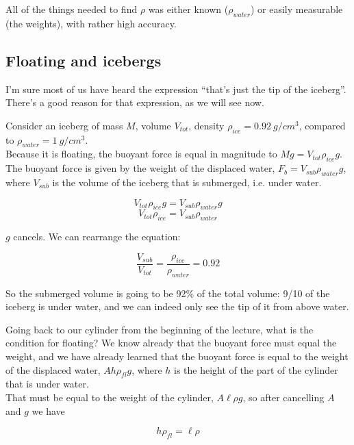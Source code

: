 All of the things needed to find $\rho$ was either known ($\rho_{water}$) or easily measurable (the weights), with rather high accuracy.

\subsection{Floating and icebergs}

I'm sure most of us have heard the expression ``that's just the tip of the iceberg''. There's a good reason for that expression, as we will see now.

Consider an iceberg of mass $M$, volume $V_{tot}$, density $\rho_{ice} = \SI{0.92}{g/cm^3}$, compared to $\rho_{water} = \SI{1}{g/cm^3}$.\\
Because it is floating, the buoyant force is equal in magnitude to $M g = V_{tot} \rho_{ice} g$. The buoyant force is given by the weight of the displaced water, $F_b = V_{sub} \rho_{water} g$, where $V_{sub}$ is the volume of the iceberg that is submerged, i.e. under water.

\begin{equation}
V_{tot} \rho_{ice} g = V_{sub} \rho_{water} g
\end{equation}
\begin{equation}
V_{tot} \rho_{ice} = V_{sub} \rho_{water}
\end{equation}

$g$ cancels. We can rearrange the equation:

\begin{equation}
\frac{V_{sub}}{V_{tot}} = \frac{\rho_{ice}}{\rho_{water}} = 0.92
\end{equation}

So the submerged volume is going to be 92\% of the total volume: 9/10 of the iceberg is under water, and we can indeed only see the tip of it from above water.

Going back to our cylinder from the beginning of the lecture, what is the condition for floating? We know already that the buoyant force must equal the weight, and we have already learned that the buoyant force is equal to the weight of the displaced water, $A h \rho_{fl} g$, where $h$ is the height of the part of the cylinder that is under water.\\
That must be equal to the weight of the cylinder, $A \ell \rho g$, so after cancelling $A$ and $g$ we have

\begin{equation}
h \rho_{fl} = \ell \rho
\end{equation}

